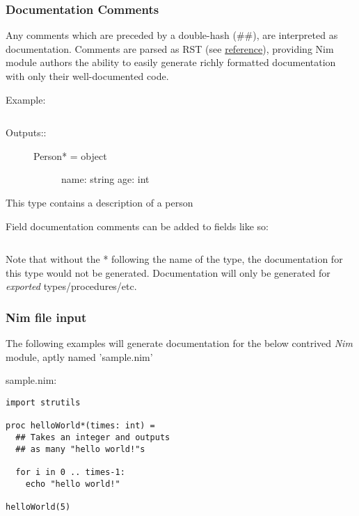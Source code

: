 \hypertarget{documentation-comments}{%
\subsubsection{Documentation Comments}\label{documentation-comments}}

Any comments which are preceded by a double-hash (\#\#), are interpreted
as documentation. Comments are parsed as RST (see
\href{http://docutils.sourceforge.net/docs/user/rst/quickref.html}{reference}),
providing Nim module authors the ability to easily generate richly
formatted documentation with only their well-documented code.

Example:

\begin{verbatim}
\end{verbatim}

\begin{description}
\item[Outputs::]
\begin{description}
\item[Person* = object]
name: string age: int
\end{description}
\end{description}

This type contains a description of a person

Field documentation comments can be added to fields like so:

\begin{verbatim}
\end{verbatim}

Note that without the {*} following the name of the type, the
documentation for this type would not be generated. Documentation will
only be generated for \emph{exported} types/procedures/etc.

\hypertarget{nim-file-input}{%
\subsubsection{Nim file input}\label{nim-file-input}}

The following examples will generate documentation for the below
contrived \emph{Nim} module, aptly named 'sample.nim'

sample.nim:

\begin{verbatim}
import strutils

proc helloWorld*(times: int) =
  ## Takes an integer and outputs
  ## as many "hello world!"s

  for i in 0 .. times-1:
    echo "hello world!"

helloWorld(5)
\end{verbatim}

